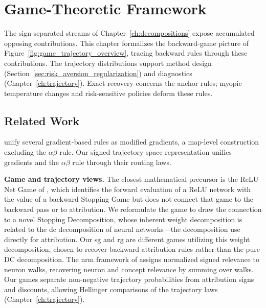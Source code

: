\chapter{Game-Theoretic Framework}\label{ch:game_theory}\label{app:supp_games}

The sign-separated streams of Chapter~\ref{ch:decompositions} expose accumulated opposing contributions. This chapter formalizes the backward-game picture of Figure~\ref{fig:game_trajectory_overview}, tracing backward rules through these contributions.
The trajectory distributions support method design (Section~\ref{sec:risk_aversion_regularization}) and diagnostics (Chapter~\ref{ch:trajectory}). Exact recovery concerns the anchor rules; myopic temperature changes and risk-sensitive policies deform these rules.

\section{Related Work}\label{ptnb:sec:related-work}\label{sec:related_work_games}

\textcite{Ancona2018} unify several gradient-based rules as modified gradients, a map-level construction excluding the $\alpha\beta$ rule. Our signed trajectory-space representation unifies gradients and the $\alpha\beta$ rule through their routing laws.

\textbf{Game and trajectory views.} The closest mathematical precursor is the ReLU Net Game of
\textcite{Gaubert2025}, which identifies the forward evaluation of a ReLU network with the value of a
backward Stopping Game but does not connect that game to the backward pass or to attribution. We
reformulate the game to draw the connection to a novel Stopping Decomposition, whose inherent
weight decomposition is related to the \ac{dc} decomposition of neural networks---the decomposition
\textcite{hiddenMono} use directly for attribution. Our \ac{sg} and \ac{rg} are different games
utilizing this weight decomposition, chosen to recover backward attribution rules rather than the
pure DC decomposition.
The \ac{nrm} framework of \textcite{Xiong2026nrm} assigns normalized signed relevance to neuron walks, recovering neuron and concept relevance by summing over walks. Our games separate non-negative trajectory probabilities from attribution signs and discounts, allowing Hellinger comparisons of the trajectory laws (Chapter~\ref{ch:trajectory}).

